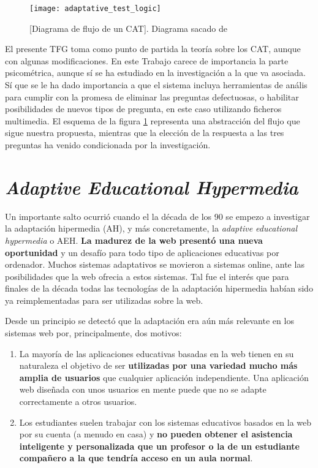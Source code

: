 \begin{figure}[htp!]
	\centering
	\texttt{[image: adaptative\_test\_logic]}
	\caption[Diagrama de flujo de un \acrshort{CAT}]{[Diagrama de flujo de un \acrshort{CAT}]. Diagrama sacado de \cite{Wainer00}}
	\label{fig:diagrama_flujo_CAT}
\end{figure}

El presente TFG toma como punto de partida la teoría sobre los \acrshort{CAT}, aunque con algunas modificaciones. En este Trabajo carece de importancia la parte psicométrica, aunque sí se ha estudiado en la investigación a la que va asociada. Sí que se le ha dado importancia a que el sistema incluya herramientas de anális para cumplir con la promesa de eliminar las preguntas defectuosas, o habilitar posibilidades de nuevos tipos de pregunta, en este caso utilizando ficheros multimedia. El esquema de la figura \ref{fig:diagrama_flujo_CAT} representa una abstracción del flujo que sigue nuestra propuesta, mientras que la elección de la respuesta a las tres preguntas ha venido condicionada por la investigación.
 
\section{\textit{Adaptive Educational Hypermedia}}

Un importante salto ocurrió cuando el la década de los 90 se empezo a investigar la adaptación hipermedia (\acrshort{AH}), y más concretamente, la \textit{adaptive educational hypermedia} o \acrshort{AEH}. \textbf{La madurez de la web presentó una nueva oportunidad} y un desafío para todo tipo de aplicaciones educativas por ordenador. Muchos sistemas adaptativos se movieron a sistemas online, ante las posibilidades que la web ofrecia a estos sistemas\cite{Brusilovsky95}\cite{Nakabayashi97}. Tal fue el interés que para finales de la década todas las tecnologías de la adaptación hipermedia habían sido ya reimplementadas para ser utilizadas sobre la web\cite{Brusilovsky99}.

Desde un principio se detectó que la adaptación era aún más relevante en los sistemas web por, principalmente, dos motivos\cite{Weber01}:

\begin{enumerate}
	\item La mayoría de las aplicaciones educativas basadas en la web tienen en su naturaleza el objetivo de ser \textbf{utilizadas por una variedad mucho más amplia de usuarios} que cualquier aplicación independiente. Una aplicación web diseñada con unos usuarios en mente puede que no se adapte correctamente a otros usuarios.
	\item Los estudiantes suelen trabajar con los sistemas educativos basados en la web por su cuenta (a menudo en casa) y \textbf{no pueden obtener el asistencia inteligente y personalizada que un profesor o la de un estudiante compañero a la que tendría acceso en un aula normal}.
\end{enumerate}

